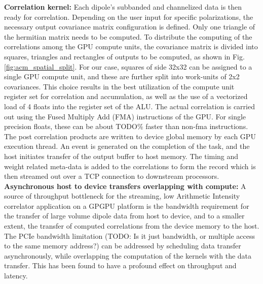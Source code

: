 \documentclass{ws-jai}
\begin{document}
\noindent \textbf {Correlation kernel:}  Each dipole's subbanded and channelized
data is  then ready for correlation.   Depending on the user  input for specific
polarizations,  the   necessary  output   covariance  matrix   configuration  is
defined. Only  one triangle  of the  hermitian matrix needs  to be  computed. To
distribute the  computing of the correlations  among the GPU compute  units, the
covariance matrix is  divided into squares, triangles and  rectangles of outputs
to be  computed, as  shown in Fig.   \ref{fig:acm_spatial_split}. For  our case,
squares of side  32x32 can be assigned  to a single GPU compute  unit, and these
are further split into work-units of 2x2 covariances. This choice results in the
best  utilization  of  the  compute   unit  register  set  for  correlation  and
accumulation, as  well as  the use  of a vectorized  load of  4 floats  into the
register set of the ALU.  The actual  correlation is carried out using the Fused
Multiply Add (FMA) instructions of the  GPU.  For single precision floats, these
can  be about  TODO\% faster  than non-fma  instructions.  The  post correlation
products are written  to device global memory by each  GPU execution thread.  An
event  is generated  on  the completion  of  the task,  and  the host  initiates
transfer  of the  output buffer  to host  memory. The  timing and  weight related
meta-data is added to the correlations to  form the record which is then streamed
out over a TCP connection to downstream processors.\\

\noindent  \textbf  {Asynchronous  host  to device  transfers  overlapping  with
  compute:} A source  of throughput bottleneck for the  streaming, low Arithmetic
Intensity  correlator  application   on  a  GPGPU  platform   is  the  bandwidth
requirement for  the transfer of large  volume dipole data from  host to device,
and to a  smaller extent, the transfer of computed  correlations from the device
memory to the  host. The PCIe bandwidth limitation (TODO:  Is it just bandwidth,
or multiple access  to the same memory address?) can  be addressed by scheduling
data transfer asynchronously,  while overlapping the computation  of the kernels
with  the data  transfer.  This  has been  found to  have a  profound effect  on
throughput and latency.\\
\end{document}
